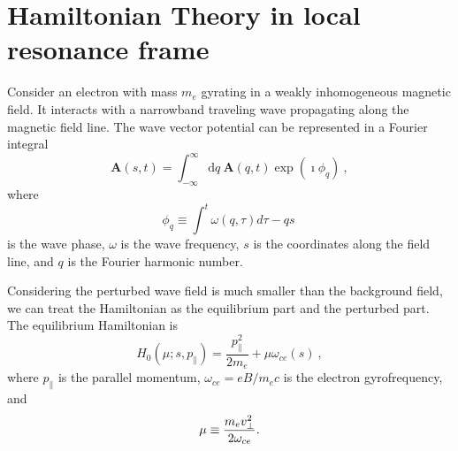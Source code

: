 \section{Hamiltonian Theory in local resonance frame}
\label{sec:theory}
Consider an electron with mass $m_e$ gyrating in a weakly inhomogeneous magnetic field.
It interacts with a  narrowband traveling wave propagating along the magnetic field line. 
The wave vector potential can be represented in a Fourier integral
\begin{equation}\label{eq.def_A}
    \mathbf{A}(s,t) =  \int_{-\infty}^{\infty}\mathrm{d} q~ \mathbf{A}\left(q,t\right) \exp(\imath\phi_{q})~,
\end{equation}
where 
\begin{equation}
    \phi_q \equiv \int^t \omega(q, \tau)d\tau - q s~
\end{equation}
is the  wave phase,
$\omega$ is the wave frequency, $s$ is the coordinates along the field line, and $q$ is the Fourier harmonic number.

Considering the perturbed wave field is much smaller than the background field, we can treat the Hamiltonian as the equilibrium part and the perturbed part.
The equilibrium Hamiltonian is
\begin{equation}\label{eq.def_H0}
    H_0(\mu;s,p_\|) =  \frac{p_\|^2}{2 m_e} + \mu \omega_{ce}(s)~,
\end{equation}
where $p_\|$ is the parallel momentum, $\omega_{ce}=eB/m_ec$ is the electron gyrofrequency, and 
\begin{equation}
\mu \equiv {m_e v_\perp^2 \over 2 \omega_{ce}}.
\end{equation}


